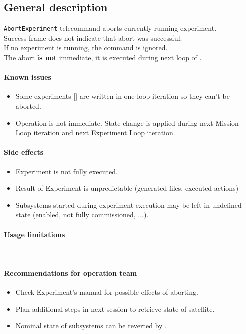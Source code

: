 

\subsection{General description}
\texttt{AbortExperiment} telecommand aborts currently running experiment.\\
Success frame does not indicate that abort was successful.\\
If no experiment is running, the command is ignored.\\
The abort \textbf{is not} immediate, it is executed during next loop of .

\paragraph{Known issues}
\begin{itemize}
	\item Some experiments [] are written in one loop iteration so they can't be aborted.
	\item Operation is not immediate. State change is applied during next Mission Loop iteration and next Experiment Loop iteration.
\end{itemize}

\paragraph{Side effects}
\begin{itemize}
	\item Experiment is not fully executed.
	\item Result of Experiment is unpredictable (generated files, executed actions)
	\item Subsystems started during experiment execution may be left in undefined state (enabled, not fully commissioned, ...).
\end{itemize}

\paragraph{Usage limitations}\mbox{}\\ 
\None

\paragraph{Recommendations for operation team}
\begin{itemize}
	\item Check Experiment's manual for possible effects of aborting.
	\item Plan additional steps in next session to retrieve state of satellite.
	\item Nominal state of subsystems can be reverted by .
\end{itemize}

